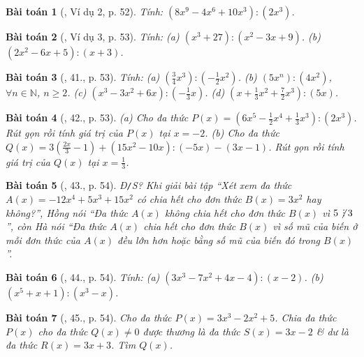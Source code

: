 \documentclass{article}
\newtheorem{baitoan}{Bài toán}
\DeclareRobustCommand{\divby}{%
	\mathrel{\vbox{\baselineskip.65ex\lineskiplimit0pt\hbox{.}\hbox{.}\hbox{.}}}%
}
\begin{document}
\begin{baitoan}[\cite{SBT_Toan_7_Canh_Dieu_tap_2}, Ví dụ 2, p. 52]
	Tính: $(8x^9 - 4x^6 + 10x^3):(2x^3)$.
\end{baitoan}

\begin{baitoan}[\cite{SBT_Toan_7_Canh_Dieu_tap_2}, Ví dụ 3, p. 53]
	Tính: (a) $(x^3 + 27):(x^2 - 3x + 9)$. (b) $(2x^2 - 6x + 5):(x + 3)$.
\end{baitoan}

\begin{baitoan}[\cite{SBT_Toan_7_Canh_Dieu_tap_2}, 41., p. 53]
	Tính: (a) $\left(\frac{3}{4}x^3\right):\left(-\frac{1}{2}x^2\right)$. (b) $(5x^n):(4x^2)$, $\forall n\in\mathbb{N}$, $n\ge2$. (c) $(x^3 - 3x^2 + 6x):\left(-\frac{1}{3}x\right)$. (d) $\left(x + \frac{1}{3}x^2 + \frac{7}{2}x^3\right):(5x)$.
\end{baitoan}

\begin{baitoan}[\cite{SBT_Toan_7_Canh_Dieu_tap_2}, 42., p. 53]
	(a) Cho đa thức $P(x) = \left(6x^5 - \frac{1}{2}x^4 + \frac{1}{3}x^3\right):(2x^3)$. Rút gọn rồi tính giá trị của $P(x)$ tại $x = -2$. (b) Cho đa thức $Q(x) = 3\left(\frac{2x}{3} - 1\right) + (15x^2 - 10x):(-5x) - (3x - 1)$. Rút gọn rồi tính giá trị của $Q(x)$ tại $x = \frac{1}{3}$.
\end{baitoan}

\begin{baitoan}[\cite{SBT_Toan_7_Canh_Dieu_tap_2}, 43., p. 54]
	\emph{Đ\texttt{/}S?} Khi giải bài tập ``Xét xem đa thức $A(x) = -12x^4 + 5x^3 + 15x^2$ có chia hết cho đơn thức $B(x) = 3x^2$ hay không?'', Hồng nói ``Đa thức $A(x)$ không chia hết cho đơn thức $B(x)$ vì $5\not\,\divby3$'', còn Hà nói ``Đa thức $A(x)$ chia hết cho đơn thức $B(x)$ vì số mũ của biến ở mỗi đơn thức của $A(x)$ đều lớn hơn hoặc bằng số mũ của biến đó trong $B(x)$''.
\end{baitoan}

\begin{baitoan}[\cite{SBT_Toan_7_Canh_Dieu_tap_2}, 44., p. 54]
	Tính: (a) $(3x^3 - 7x^2 + 4x - 4):(x - 2)$. (b) $(x^5 + x + 1):(x^3 - x)$.
\end{baitoan}

\begin{baitoan}[\cite{SBT_Toan_7_Canh_Dieu_tap_2}, 45., p. 54]
	Cho đa thức $P(x) = 3x^3 - 2x^2 + 5$. Chia đa thức $P(x)$ cho đa thức $Q(x)\ne0$ được thương là đa thức $S(x) = 3x - 2$ \& dư là đa thức $R(x) = 3x + 3$. Tìm $Q(x)$.
\end{baitoan}
\end{document}
